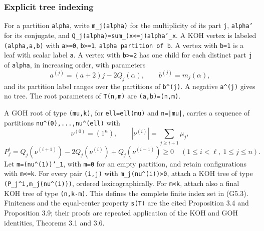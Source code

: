 \documentclass[
  10pt,
]{article}
\begin{document}
\subsubsection{Explicit tree indexing}\label{explicit-tree-indexing}

For a partition \texttt{\small alpha}, write
\texttt{\small m\_\allowbreak{}j(\allowbreak{}alpha)\allowbreak{}} for
the multiplicity of its part \texttt{\small j}, \texttt{\small alpha'}
for its conjugate, and
\texttt{\small Q\_\allowbreak{}j(\allowbreak{}alpha)\allowbreak{}=\allowbreak{}sum\_\allowbreak{}(\allowbreak{}x<=\allowbreak{}j)\allowbreak{}alpha'\_\allowbreak{}x}.
A KOH vertex is labeled
\texttt{\small (\allowbreak{}alpha,\allowbreak{}a,\allowbreak{}b)\allowbreak{}}
with \texttt{\small a>=\allowbreak{}0},
\texttt{\small b>=\allowbreak{}1}, \texttt{\small alpha partition of b}.
A vertex with \texttt{\small b=\allowbreak{}1} is a leaf with scalar
label \texttt{\small a}. A vertex with \texttt{\small b>=\allowbreak{}2}
has one child for each distinct part \texttt{\small j} of
\texttt{\small alpha}, in increasing order, with parameters \[
a^{(j)}=(a+2)j-2Q_j(\alpha),\qquad
b^{(j)}=m_j(\alpha),
\] and its partition label ranges over the partitions of
\texttt{\small b\textasciicircum{}(\allowbreak{}j)\allowbreak{}}. A
negative
\texttt{\small a\textasciicircum{}(\allowbreak{}j)\allowbreak{}} gives
no tree. The root parameters of
\texttt{\small T(\allowbreak{}n,\allowbreak{}m)\allowbreak{}} are
\texttt{\small (\allowbreak{}a,\allowbreak{}b)\allowbreak{}=\allowbreak{}(\allowbreak{}n,\allowbreak{}m)\allowbreak{}}.

A GOH root of type
\texttt{\small (\allowbreak{}mu,\allowbreak{}k)\allowbreak{}}, for
\texttt{\small ell=\allowbreak{}ell(\allowbreak{}mu)\allowbreak{}} and
\texttt{\small n=\allowbreak{}|mu|}, carries a sequence of partitions
\texttt{\small nu\textasciicircum{}(\allowbreak{}0)\allowbreak{},\allowbreak{}...,\allowbreak{}nu\textasciicircum{}(\allowbreak{}ell)\allowbreak{}}
with \[
\nu^{(0)}=(1^n),\qquad
|\nu^{(i)}|=\sum_{j\ge i+1}\mu_j,
\] \[
P_j^i=Q_j(\nu^{(i+1)})-2Q_j(\nu^{(i)})+Q_j(\nu^{(i-1)})\ge0
\quad(1\le i<\ell,\ 1\le j\le n).
\] Let
\texttt{\small m=\allowbreak{}(\allowbreak{}nu\textasciicircum{}(\allowbreak{}1)\allowbreak{})\allowbreak{}'\_\allowbreak{}1},
with \texttt{\small m=\allowbreak{}0} for an empty partition, and retain
configurations with \texttt{\small m<=\allowbreak{}k}. For every pair
\texttt{\small (\allowbreak{}i,\allowbreak{}j)\allowbreak{}} with
\texttt{\small m\_\allowbreak{}j(\allowbreak{}nu\textasciicircum{}(\allowbreak{}i)\allowbreak{})\allowbreak{}>0},
attach a KOH tree of type
\texttt{\small (\allowbreak{}P\_\allowbreak{}j\textasciicircum{}i,\allowbreak{}m\_\allowbreak{}j(\allowbreak{}nu\textasciicircum{}(\allowbreak{}i)\allowbreak{})\allowbreak{})\allowbreak{}},
ordered lexicographically. For \texttt{\small m<k}, attach also a final
KOH tree of type
\texttt{\small (\allowbreak{}n,\allowbreak{}k-\allowbreak{}m)\allowbreak{}}.
This defines the complete finite index set in (G5.3). Finiteness and the
equal-center property \texttt{\small s(\allowbreak{}T)\allowbreak{}} are
the cited Proposition 3.4 and Proposition 3.9; their proofs are repeated
application of the KOH and GOH identities, Theorems 3.1 and 3.6.
\end{document}
